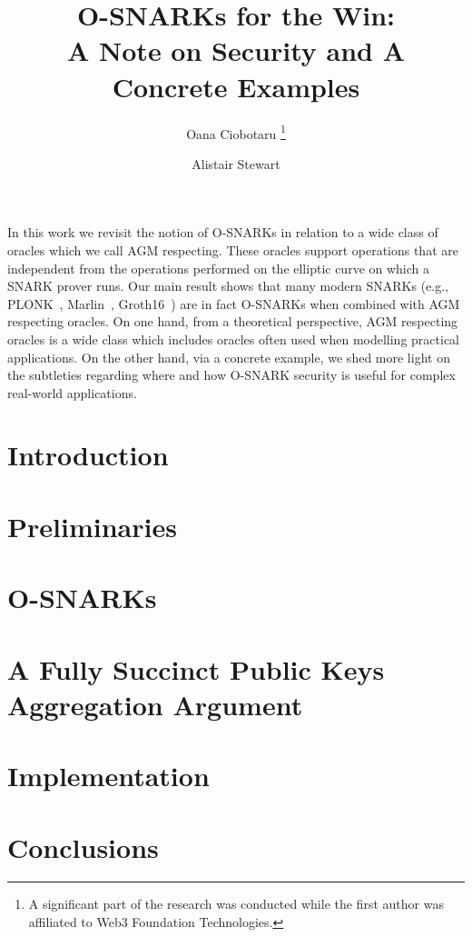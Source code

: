 \documentclass[10pt]{article}
\title{O-SNARKs for the Win: \\
 A Note on Security and A Concrete Examples}
\author[1]{Oana Ciobotaru
\thanks{A significant part of the research was conducted while the first author was affiliated to Web3 Foundation Technologies.}}
\author[2]{Alistair Stewart}
\affil[1]{OpenZeppelin}
\affil[2]{Web3 Foundation Technologies}
\begin{document}
   \maketitle

\abstract In this work we revisit the notion of O-SNARKs in relation to a wide class of 
oracles which we call AGM respecting. These oracles support operations that are independent from the operations 
performed on the elliptic curve on which a SNARK prover runs. Our main result shows that many modern SNARKs 
(e.g., PLONK~\cite{plonk}, Marlin~\cite{marlin}, Groth16~\cite{groth16}) are in fact O-SNARKs when combined 
with AGM respecting oracles. On one hand, from a theoretical perspective, AGM respecting oracles is a wide class 
which includes oracles often used when modelling practical applications. On the other hand, via a concrete example, 
we shed more light on the subtleties regarding where and how O-SNARK security is useful for complex real-world applications.
    
\section{Introduction} \label{sec_intro}


\section{Preliminaries} \label{sec_prelims}

%
%
%


\section{O-SNARKs} \label{sec:short_snarks_defs}

%
%
%

\section{A Fully Succinct Public Keys Aggregation Argument} \label{sec_apk_proofs}


\section{Implementation} \label{sec_implementation}


\section{Conclusions} \label{conclusions}


 

\appendix

%

\end{document}
